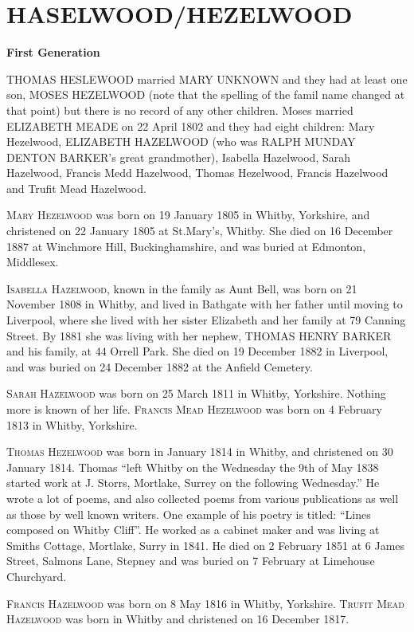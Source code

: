 \section{HASELWOOD/HEZELWOOD}

\textbf{First Generation}

\uppercase{Thomas Heslewood} married \uppercase{Mary Unknown} and they had at least one son, \uppercase{Moses Hezelwood} (note that the spelling of the famil name changed at that point) but there is no record of any other children.  Moses married \uppercase{Elizabeth Meade} on 22 April 1802 and they had eight children: Mary Hezelwood, \uppercase{Elizabeth Hazelwood} (who was \uppercase{Ralph Munday Denton Barker}'s great grandmother), Isabella Hazelwood, Sarah Hazelwood, Francis Medd Hazelwood, Thomas Hezelwood, Francis Hazelwood and Trufit Mead Hazelwood. 

\textsc{Mary Hezelwood} was born on 19 January 1805 in Whitby, Yorkshire, and christened on 22 January 1805 at St.Mary's,	Whitby. She died on 16 December 1887 at Winchmore Hill, Buckinghamshire, and was buried at Edmonton, Middlesex.

\textsc{Isabella Hazelwood}, known in the family as Aunt Bell, was born on 21 November 1808 in Whitby, and lived in Bathgate with her father until moving to Liverpool, where she lived with her sister Elizabeth and her family at 79 Canning Street. By 1881 she was living with her nephew, \uppercase{Thomas Henry Barker} and his family, at 44 Orrell Park.  She died on 19 December 1882 in Liverpool, and was buried on 24 December 1882 at the Anfield Cemetery. 	

\textsc{Sarah Hazelwood} was born on 25 March 1811 in	Whitby, Yorkshire. Nothing more is known of her life.
\textsc{Francis Mead Hezelwood} was born on 4 February 1813 in Whitby, Yorkshire.

\textsc{Thomas Hezelwood} was born in January 1814 in	Whitby, and christened on 30 January 1814.  Thomas ``left Whitby on the Wednesday the 9th of May 1838 started work at J. Storrs, Mortlake, Surrey on the following Wednesday.'' He wrote a lot of poems, and also collected poems from various publications as well as those by well known writers. One example of his poetry is titled: ``Lines composed on Whitby Cliff''.  He worked as a cabinet maker and was living at Smiths Cottage, Mortlake, Surry in 1841. He died on 2 February 1851 at 6 James Street, Salmons Lane, Stepney and was buried on 7 February at Limehouse Churchyard.

\textsc{Francis Hazelwood} was born on 8 May 1816 in Whitby, Yorkshire.
\textsc{Trufit Mead Hazelwood} was born in Whitby and christened on 16 December 1817.


